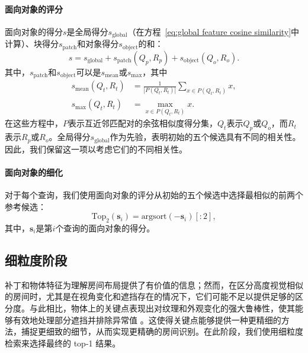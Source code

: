 \vspace{-6pt}
\paragraph{面向对象的评分} 面向对象的得分\(s\)是全局得分\(s_{\text{global}}\)（在方程~\ref{eq:global feature cosine similarity}中计算）、块得分\(s_{\text{patch}}\)和对象得分\(s_{\text{object}}\)的和：
\begin{equation}
    s = s_{\text{global}} + s_{\text{patch}}(Q_p, R_p) + s_{\text{object}}(Q_o, R_o).
    \label{eq:object-aware scoring}
\end{equation}
其中，\(s_{\text{patch}}\)和\(s_{\text{object}}\)可以是\(s_{\text{mean}}\)或\(s_{\max}\)，其中
\begin{subequations}
\begin{align}
    s_{\text{mean}}(Q_t, R_t) &= \frac{1}{|P(Q_t, R_t)|} \sum_{x \in P(Q_t, R_t)} x,
    \label{eq:mean}\\
    s_{\max}(Q_t, R_t) &= \max_{x \in P(Q_t, R_t)} x.
    \label{eq:max}
\end{align}
\end{subequations}
在这些方程中，\(P\)表示互近邻匹配对的余弦相似度得分集，\(Q_t\)表示\(Q_p\)或\(Q_o\)，而\(R_t\)表示\(R_p\)或\(R_o\)。全局得分\(s_{\text{global}}\)作为先验，表明初始的五个候选具有不同的相关性。因此，我们保留这一项以考虑它们的不同相关性。

\vspace{-8pt}
\paragraph{面向对象的细化} 对于每个查询，我们使用面向对象的评分从初始的五个候选中选择最相似的前两个参考候选：
\begin{equation}
    \text{Top}_2(\mathbf{s}_{i}) = \text{argsort}(-\mathbf{s}_{i})[:2],
\end{equation}
其中，\(\mathbf{s}_{i}\)是第\(i\)个查询的面向对象的得分。
\subsection{细粒度阶段}

补丁和物体特征为理解房间布局提供了有价值的信息；然而，在区分高度视觉相似的房间时，尤其是在视角变化和遮挡存在的情况下，它们可能不足以提供足够的区分度。与此相比，物体上的关键点表现出对纹理和外观变化的强大鲁棒性，使其能够有效地处理部分遮挡并排除异常值 \cite{1498756}。这使得关键点能够提供一种更精细的方法，捕捉更细致的细节，从而实现更精确的房间识别。在此阶段，我们使用细粒度检索来选择最终的 top-1 结果。
